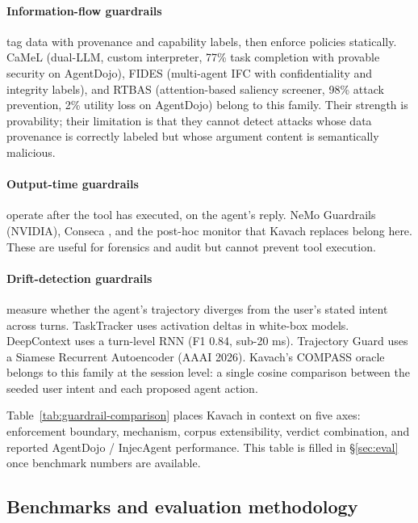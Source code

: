 \paragraph{Information-flow guardrails} tag data with provenance and capability
labels, then enforce policies statically. CaMeL \cite{debenedetti2025camel}
(dual-LLM, custom interpreter, 77\% task completion with provable security on
AgentDojo), FIDES \cite{costa2025fides} (multi-agent IFC with confidentiality and
integrity labels), and RTBAS \cite{zhong2025rtbas} (attention-based saliency
screener, 98\% attack prevention, 2\% utility loss on AgentDojo) belong to this
family. Their strength is provability; their limitation is that they cannot
detect attacks whose data provenance is correctly labeled but whose argument
content is semantically malicious.

\paragraph{Output-time guardrails} operate after the tool has executed, on the
agent's reply. NeMo Guardrails (NVIDIA), Conseca \cite{tsai2025conseca}, and
the post-hoc monitor that Kavach replaces belong here. These are useful for
forensics and audit but cannot prevent tool execution.

\paragraph{Drift-detection guardrails} measure whether the agent's trajectory
diverges from the user's stated intent across turns. TaskTracker
\cite{abdelnabi2024tasktracker} uses activation deltas in white-box models.
DeepContext \cite{albrethsen2026deepcontext} uses a turn-level RNN (F1 0.84,
sub-20 ms). Trajectory Guard \cite{advani2026trajectoryguard} uses a Siamese
Recurrent Autoencoder (AAAI 2026). Kavach's COMPASS oracle belongs to this
family at the session level: a single cosine comparison between the seeded
user intent and each proposed agent action.

Table~\ref{tab:guardrail-comparison} places Kavach in context on five axes:
enforcement boundary, mechanism, corpus extensibility, verdict combination, and
reported AgentDojo / InjecAgent performance. This table is filled in
\S\ref{sec:eval} once benchmark numbers are available.

\subsection{Benchmarks and evaluation methodology}

